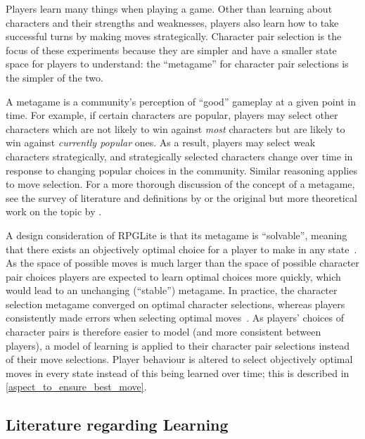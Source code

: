 Players learn many things when playing a game. Other than learning about
characters and their strengths and weaknesses, players also learn how to take
successful turns by making moves strategically. Character pair selection is the
focus of these experiments because they are simpler and have a smaller state
space for players to understand: the ``metagame'' for character pair selections
is the simpler of the two.

\label{metagame_explanation}
A metagame is a community's perception of ``good'' gameplay at a given point in
time. For example, if certain characters are popular, players may select other
characters which are not likely to win against \emph{most} characters but are
likely to win against \emph{currently popular} ones. As a result, players may
select weak characters strategically, and strategically selected characters
change over time in response to changing popular choices in the community.
Similar reasoning applies to move selection. For a more thorough discussion of
the concept of a metagame, see the survey of literature and definitions by
\citet{metagaming_in_esports} or the original but more theoretical work on the
topic by \citet{howard1971metagames_seminal}.

\label{modelling_char_selection_instead_of_move_selection}
A design consideration of RPGLite is that its metagame is ``solvable'', meaning
that there exists an objectively optimal choice for a player to make in any
state~\cite{kavanagh2021thesis}. As the space of possible moves is much larger
than the space of possible character pair choices players are expected to learn
optimal choices more quickly, which would lead to an unchanging (``stable'')
metagame. In practice, the character selection metagame converged on optimal
character selections, whereas players consistently made errors when selecting
optimal moves~\cite{kavanagh2021gameplay}. As players' choices of character
pairs is therefore easier to model (and more consistent between players), a
model of learning is applied to their character pair selections instead of their
move selections. Player behaviour is altered to select objectively optimal moves
in every state instead of this being learned over time; this is described in
\cref{aspect_to_ensure_best_move}.



\subsection{Literature regarding Learning}
\label{subsec:models_of_learning_discussed}

